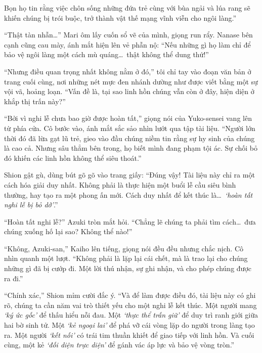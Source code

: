 \documentclass[../main.tex]{subfiles}
\begin{document}

Bọn họ tin rằng việc chôn sống những đứa trẻ cùng với bùa ngải và lúa rang sẽ khiến chúng bị trói buộc, trở thành vật thế mạng vĩnh viễn cho ngôi làng.''

``Thật tàn nhẫn\dots'' Mari ôm lấy cuốn sổ vẽ của mình, giọng run rẩy. Nanase bên cạnh cũng cau mày, ánh mắt hiện lên vẻ phẫn nộ: ``Nếu những gì họ làm chỉ để bảo vệ ngôi làng một cách mù quáng\dots\ thật không thể dung thứ!''

``Nhưng điều quan trọng nhất không nằm ở đó,'' tôi chỉ tay vào đoạn văn bản ở trang cuối cùng, nơi những nét mực đen nhánh dường như được viết bằng một sự vội vã, hoảng loạn. ``Vấn đề là, tại sao linh hồn chúng vẫn còn ở đây, hiện diện ở khắp thị trấn này?''

``Bởi vì nghi lễ chưa bao giờ được hoàn tất,'' giọng nói của Yuko-sensei vang lên từ phía cửa. Cô bước vào, ánh mắt sắc sảo nhìn lướt qua tập tài liệu. ``Người lớn thời đó đã lừa gạt lũ trẻ, gieo vào đầu chúng niềm tin rằng sự hy sinh của chúng là cao cả. Nhưng sâu thẳm bên trong, họ biết mình đang phạm tội ác. Sự chối bỏ đó khiến các linh hồn không thể siêu thoát.''

Shion gật gù, dùng bút gõ gõ vào trang giấy: ``Đúng vậy! Tài liệu này chỉ ra một cách hóa giải duy nhất. Không phải là thực hiện một buổi lễ cầu siêu bình thường, hay tạo ra một phong ấn mới. Cách duy nhất để kết thúc là\dots\ \textit{`hoàn tất nghi lễ bị bỏ dở'}.''

``Hoàn tất nghi lễ?'' Azuki tròn mắt hỏi. ``Chẳng lẽ chúng ta phải tìm cách\dots\ đưa chúng xuống hố lại sao? Không thể nào!''

``Không, Azuki-san,'' Kaiho lên tiếng, giọng nói đều đều nhưng chắc nịch. Cô nhìn quanh một lượt. ``Không phải là lặp lại cái chết, mà là trao lại cho chúng những gì đã bị cướp đi. Một lời thú nhận, sự ghi nhận, và cho phép chúng được ra đi.''

``Chính xác,'' Shion mỉm cười đắc ý. ``Và để làm được điều đó, tài liệu này có ghi rõ, chúng ta cần năm vai trò thiết yếu cho một nghi lễ kết thúc. Một người mang \textit{`ký ức gốc'} để thấu hiểu nỗi đau. Một \textit{`thực thể trấn giữ'} để duy trì ranh giới giữa hai bờ sinh tử. Một \textit{`kẻ ngoại lai'} để phá vỡ cái vòng lặp do người trong làng tạo ra. Một người \textit{`kết nối'} có trái tim thuần khiết để giao tiếp với linh hồn. Và cuối cùng, một kẻ \textit{`đối diện trực diện'} để gánh vác áp lực và bảo vệ vòng tròn.''
\end{document}
